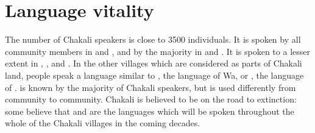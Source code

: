 \section{Language vitality}
\label{sec:vital}

The number of Chakali speakers is close to 3500 individuals. It is spoken by all community members in  and , and by the majority in  and . It is spoken to a lesser extent in , ,  and .  In the other villages which are considered as  parts of Chakali land, people speak a language similar to , the language of  Wa, or , the language of .  is known by the majority of Chakali speakers,  but is used differently from community to community.   Chakali is believed to be on the road to extinction: some believe that  and  are the languages which will be spoken throughout the whole of the Chakali villages in the coming decades.



